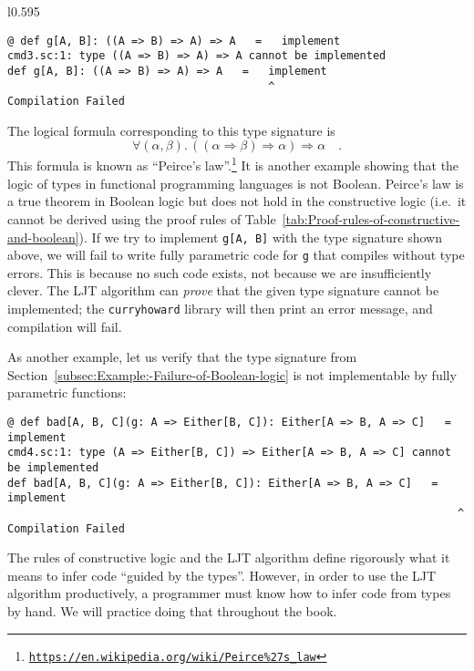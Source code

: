 \begin{wrapfigure}{l}{0.595\columnwidth}%
\vspace{-0.95\baselineskip}
\begin{lstlisting}
@ def g[A, B]: ((A => B) => A) => A   =   implement
cmd3.sc:1: type ((A => B) => A) => A cannot be implemented
def g[A, B]: ((A => B) => A) => A   =   implement
                                        ^
Compilation Failed
\end{lstlisting}

\vspace{-0.7\baselineskip}
\end{wrapfigure}%

\noindent The logical formula corresponding to this type signature
is \vspace{-0\baselineskip}
\begin{equation}
\forall(\alpha,\beta).\,\left(\left(\alpha\Rightarrow\beta\right)\Rightarrow\alpha\right)\Rightarrow\alpha\quad.\label{eq:ch-example-3-peirce-law}
\end{equation}
This formula is known as \textsf{``}Peirce\textsf{'}s law\textsf{''}.\footnote{\texttt{\href{https://en.wikipedia.org/wiki/Peirce\%27s_law}{https://en.wikipedia.org/wiki/Peirce\%27s\_law}}}
It is another example showing that the logic of types in functional
programming languages is not Boolean. Peirce\textsf{'}s law is a true theorem
in Boolean logic but does not hold in the constructive logic (i.e.~it
cannot be derived using the proof rules of Table~\ref{tab:Proof-rules-of-constructive-and-boolean}).
If we try to implement \lstinline!g[A, B]! with the type signature
shown above, we will fail to write fully parametric code for \lstinline!g!
that compiles without type errors. This is because no such code exists,
\textemdash{} not because we are insufficiently clever. The LJT algorithm
can \emph{prove} that the given type signature cannot be implemented;
the \texttt{curryhoward} library will then print an error message,
and compilation will fail.

As another example, let us verify that the type signature from Section~\ref{subsec:Example:-Failure-of-Boolean-logic}
is not implementable by fully parametric functions:
\begin{lstlisting}
@ def bad[A, B, C](g: A => Either[B, C]): Either[A => B, A => C]   =   implement
cmd4.sc:1: type (A => Either[B, C]) => Either[A => B, A => C] cannot be implemented
def bad[A, B, C](g: A => Either[B, C]): Either[A => B, A => C]   =   implement
                                                                     ^
Compilation Failed
\end{lstlisting}
The rules of constructive logic and the LJT algorithm define rigorously
what it means to infer code \textsf{``}guided by the types\textsf{''}. However, in
order to use the LJT algorithm productively, a programmer must know
how to infer code from types by hand. We will practice doing that
throughout the book.

